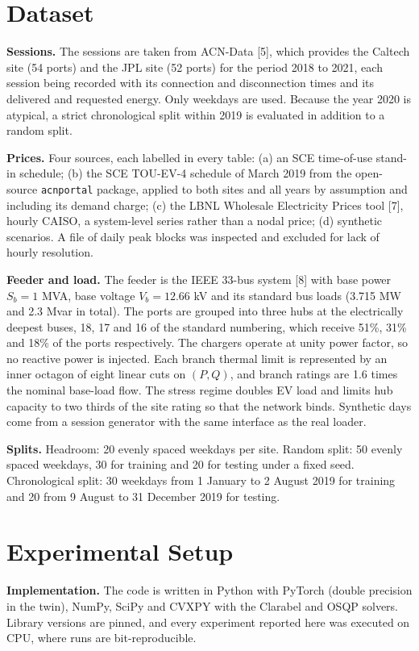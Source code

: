 \documentclass[11pt]{article}
\begin{document}
\section{Dataset}\label{sec:data}
\textbf{Sessions.} The sessions are taken from ACN-Data [5], which provides the Caltech site (54 ports) and the JPL site (52 ports) for the period 2018 to 2021, each session being recorded with its connection and disconnection times and its delivered and requested energy. Only weekdays are used. Because the year 2020 is atypical, a strict chronological split within 2019 is evaluated in addition to a random split.

\textbf{Prices.} Four sources, each labelled in every table: (a) an SCE time-of-use stand-in schedule; (b) the SCE TOU-EV-4 schedule of March 2019 from the open-source \texttt{acnportal} package, applied to both sites and all years by assumption and including its demand charge; (c) the LBNL Wholesale Electricity Prices tool [7], hourly CAISO, a system-level series rather than a nodal price; (d) synthetic scenarios. A file of daily peak blocks was inspected and excluded for lack of hourly resolution.

\textbf{Feeder and load.} The feeder is the IEEE 33-bus system [8] with base power $S_b=1$ MVA, base voltage $V_b=12.66$ kV and its standard bus loads (3.715 MW and 2.3 Mvar in total). The ports are grouped into three hubs at the electrically deepest buses, 18, 17 and 16 of the standard numbering, which receive 51\%, 31\% and 18\% of the ports respectively. The chargers operate at unity power factor, so no reactive power is injected. Each branch thermal limit is represented by an inner octagon of eight linear cuts on $(P,Q)$, and branch ratings are 1.6 times the nominal base-load flow. The stress regime doubles EV load and limits hub capacity to two thirds of the site rating so that the network binds. Synthetic days come from a session generator with the same interface as the real loader.

\textbf{Splits.} Headroom: 20 evenly spaced weekdays per site. Random split: 50 evenly spaced weekdays, 30 for training and 20 for testing under a fixed seed. Chronological split: 30 weekdays from 1 January to 2 August 2019 for training and 20 from 9 August to 31 December 2019 for testing.

\section{Experimental Setup}\label{sec:setup}
\textbf{Implementation.} The code is written in Python with PyTorch (double precision in the twin), NumPy, SciPy and CVXPY with the Clarabel and OSQP solvers. Library versions are pinned, and every experiment reported here was executed on CPU, where runs are bit-reproducible.
\end{document}
